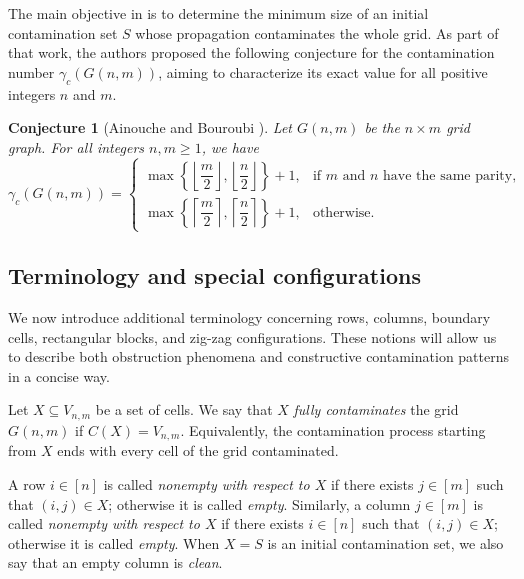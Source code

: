 \documentclass[letterpaper,12pt]{article}
\newtheorem{conjecture}{Conjecture}
\begin{document}
 

 

The main objective in \cite{Ainouche2021} is to determine the minimum size of an initial contamination set \(S\) whose propagation contaminates the whole grid. As part of that work, the authors proposed the following conjecture for the contamination number \(\gamma_c(G(n,m))\), aiming to characterize its exact value for all positive integers \(n\) and \(m\).

\begin{conjecture}[Ainouche and Bouroubi \cite{Ainouche2021}] \label{conj}
Let \( G(n,m) \) be the \( n \times m \) grid graph. For all integers \( n, m \geq 1 \), we have 
\begin{equation}
        \gamma_c(G(n,m)) =
    \begin{cases}
        \max\left\{ \left\lfloor \dfrac{m}{2} \right\rfloor, \left\lfloor \dfrac{n}{2} \right\rfloor \right\} + 1, & \text{if $m$ and $n$ have the same parity}, \\[1.0em]
        \max\left\{ \left\lceil \dfrac{m}{2} \right\rceil, \left\lceil \dfrac{n}{2} \right\rceil \right\} + 1, & \text{otherwise}.
    \end{cases}
\end{equation}
\end{conjecture}

 

\subsection{Terminology and special configurations}

We now introduce additional terminology concerning rows, columns, boundary cells, rectangular blocks, and zig-zag configurations. These notions will allow us to describe both obstruction phenomena and constructive contamination patterns in a concise way.


Let $X\subseteq V_{n,m}$ be a set of cells. We say that $X$ \emph{fully contaminates} the grid $G(n,m)$ if $C(X)=V_{n,m}$. Equivalently, the contamination process starting from $X$ ends with every cell of the grid contaminated.

A row $i\in[n]$ is called \emph{nonempty with respect to $X$} if there exists $j\in[m]$ such that
$(i,j)\in X$; otherwise it is called \emph{empty}. Similarly, a column $j\in[m]$ is called
\emph{nonempty with respect to $X$} if there exists $i\in[n]$ such that $(i,j)\in X$; otherwise
it is called \emph{empty}. When $X=S$ is an initial contamination set, we also say that an empty
column is \emph{clean}.
\end{document}
